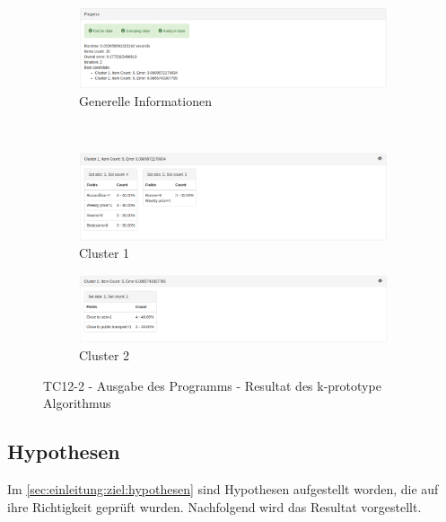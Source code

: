\begin{figure}[H]
	\begin{subfigure}[t]{1\textwidth}
		\centering
		\includegraphics[width=1\textwidth]{images/tc12-kprototype-1}
		\caption{Generelle Informationen}
		\label{fig:testingfazit:testing:testcases:12-2-1}
	\end{subfigure} \\
	\begin{subfigure}[t]{1\textwidth}
		\centering
		\includegraphics[width=1\textwidth]{images/tc12-kprototype-2}
		\caption{Cluster 1}
		\label{fig:testingfazit:testing:testcases:12-2-2}
	\end{subfigure}
	\begin{subfigure}[t]{1\textwidth}
		\centering
		\includegraphics[width=1\textwidth]{images/tc12-kprototype-3}
		\caption{Cluster 2}
		\label{fig:testingfazit:testing:testcases:12-2-3}
	\end{subfigure}
	\caption{TC12-2 - Ausgabe des Programms - Resultat des k-prototype Algorithmus}
	\label{fig:testingfazit:testing:testcases:12-2}
\end{figure}

\subsection{Hypothesen}
\label{sec:testingfazit:testing:hypothesen}
Im \cref{sec:einleitung:ziel:hypothesen}  sind Hypothesen aufgestellt worden, die auf ihre Richtigkeit geprüft wurden. Nachfolgend wird das Resultat vorgestellt.

